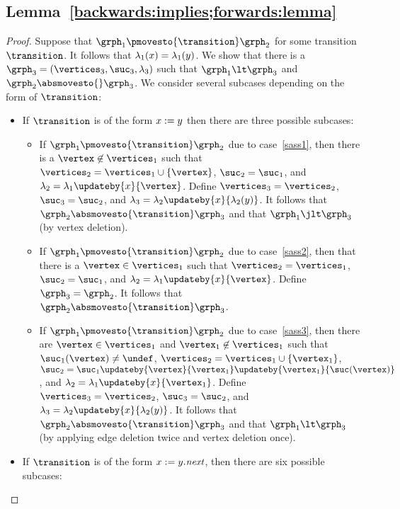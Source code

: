 \subsection*{Lemma~\ref{backwards:implies;forwards:lemma}}
\begin{proof}
Suppose that $\grph_1\pmovesto{\transition}\grph_2$ for some transition $\transition$.
%
It follows that $\lambda_1(x)=\lambda_1(y)$.
%
We show that there is a $\grph_3=\tuple{\vertices_3,\suc_3,\labeling_3}$ such that
$\grph_1\lt\grph_3$ and $\grph_2\absmovesto{}\grph_3$.
%
We consider several subcases depending on the form of $\transition$:
\begin{itemize}
\item
If $\transition$ is of the form $x:=y$ then there are three 
possible subcases:
\begin{itemize}
\item
If $\grph_1\pmovesto{\transition}\grph_2$ due to case~\ref{sass1}, then
there is a $\vertex\not\in\vertices_1$ such that
$\vertices_2=\vertices_1\cup\set{\vertex}$,
$\suc_2=\suc_1$, and $\labeling_2=\labeling_1\updateby{\xvar}{\vertex}$.
%
Define 
$\vertices_3=\vertices_2$, $\suc_3=\suc_2$, and
$\labeling_3=\labeling_2\updateby{\xvar}{\labeling_2(\yvar)}$.
%
It follows that $\grph_2\absmovesto{\transition}\grph_3$ and that 
$\grph_1\jlt\grph_3$ (by vertex deletion).
\item
If $\grph_1\pmovesto{\transition}\grph_2$ due to case~\ref{sass2}, then
that there is a $\vertex\in\vertices_1$ such that
$\vertices_2=\vertices_1$,
$\suc_2=\suc_1$, and $\labeling_2=\labeling_1\updateby{\xvar}{\vertex}$.
%
Define $\grph_3=\grph_2$.
%
It follows that $\grph_2\absmovesto{\transition}\grph_3$.
\item
If $\grph_1\pmovesto{\transition}\grph_2$ due to case~\ref{sass3}, then
there are $\vertex\in\vertices_1$ and $\vertex_1\not\in\vertices_1$ such that
$\suc_1(\vertex)\neq\undef$,
$\vertices_2=\vertices_1\cup\set{\vertex_1}$,
$\suc_2=\suc_1\updateby{\vertex}{\vertex_1}\updateby{\vertex_1}{\suc(\vertex)}$, and
$\labeling_2=\labeling_1\updateby{\xvar}{\vertex_1}$.
%
Define 
$\vertices_3=\vertices_2$, $\suc_3=\suc_2$, and
$\labeling_3=\labeling_2\updateby{\xvar}{\labeling_2(\yvar)}$.
%
It follows that 
$\grph_2\absmovesto{\transition}\grph_3$ and that 
$\grph_1\lt\grph_3$ (by applying edge deletion twice and vertex deletion once).
\end{itemize}
\item
If $\transition$ is of the form $x:=y.{\it next}$,
then  there are six possible subcases:



\end{itemize}
\end{proof}
